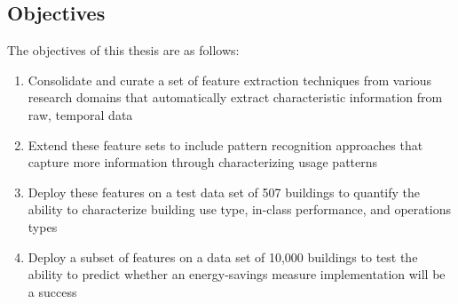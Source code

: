 \subsection{Objectives}
The objectives of this thesis are as follows:
\begin{enumerate}
\item Consolidate and curate a set of feature extraction techniques from various research domains that automatically extract characteristic information from raw, temporal data
\item Extend these feature sets to include pattern recognition approaches that capture more information through characterizing usage patterns
\item Deploy these features on a test data set of 507 buildings to quantify the ability to characterize building use type, in-class performance, and operations types
\item Deploy a subset of features on a data set of 10,000 buildings to test the ability to predict whether an energy-savings measure implementation will be a success 
\end{enumerate}
